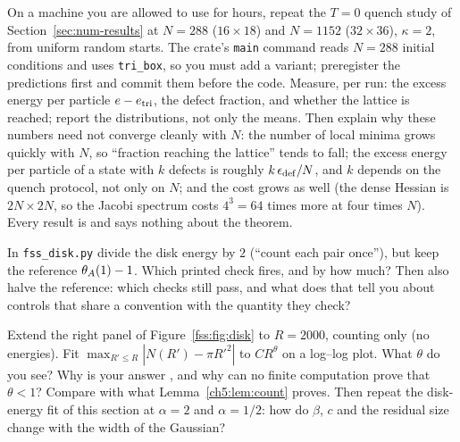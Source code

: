 \begin{exercise}[Relaxations at $N=288$ and $N=1152$: a proposal]\label{fss:ex:relax}
On a machine you are allowed to use for hours, repeat the $T=0$ quench study of Section~\ref{sec:num-results} at
$N=288$ ($16\times18$) and $N=1152$ ($32\times36$), $\kappa=2$, from uniform random starts. The crate's \texttt{main}
command reads $N=288$ initial conditions and uses \texttt{tri\_box}, so you must add a variant; preregister the
predictions first and commit them before the code. Measure, per run: the excess energy per particle
$e-e_{\rm tri}$, the defect fraction, and whether the lattice is reached; report the distributions, not only the means.
Then explain why these numbers need not converge cleanly with $N$: the number of local minima grows quickly with $N$,
so ``fraction reaching the lattice'' tends to fall; the excess energy per particle of a state with $k$ defects is
roughly $k\,\epsilon_{\rm def}/N$, and $k$ depends on the quench protocol, not only on $N$; and the cost grows as well
(the dense Hessian is $2N\times2N$, so the Jacobi spectrum costs $4^3=64$ times more at four times $N$). Every result is
\tierX{} and says nothing about the theorem.
\end{exercise}

\begin{exercise}\label{fss:ex:half}
In \texttt{fss\_disk.py} divide the disk energy by $2$ (``count each pair once''), but keep the reference
$\theta_A(1)-1$. Which printed check fires, and by how much? Then also halve the reference: which checks still pass,
and what does that tell you about controls that share a convention with the quantity they check?
\end{exercise}

\begin{exercise}\label{fss:ex:gauss}
Extend the right panel of Figure~\ref{fss:fig:disk} to $R=2000$, counting only (no energies). Fit
$\max_{R'\le R}|N(R')-\pi R'^2|$ to $C R^{\theta}$ on a log--log plot. What $\theta$ do you see? Why is your answer
\tierX{}, and why can no finite computation prove that $\theta<1$? Compare with what Lemma~\ref{ch5:lem:count} proves.
Then repeat the disk-energy fit of this section at $\alpha=2$ and $\alpha=1/2$: how do $\beta$, $c$ and the residual size
change with the width of the Gaussian?
\end{exercise}
